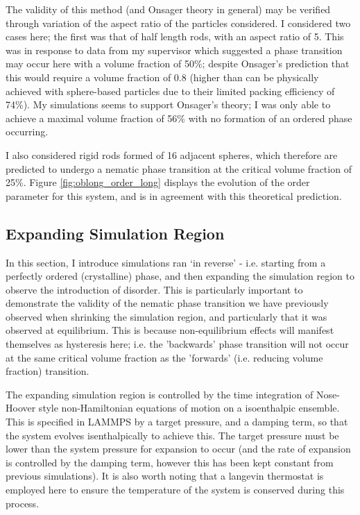 \documentclass[11pt, a4paper]{article} %
\begin{document}
The validity of this method (and Onsager theory in general) may be verified through variation of the aspect ratio of the particles considered. I considered two cases here; the first was that of half length rods, with an aspect ratio of 5. This was in response to data from my supervisor which suggested a phase transition may occur here with a volume fraction of 50\%; despite Onsager's prediction that this would require a volume fraction of 0.8 (higher than can be physically achieved with sphere-based particles due to their limited packing efficiency of 74\%). My simulations seems to support Onsager's theory; I was only able to achieve a maximal volume fraction of 56\% with no formation of an ordered phase occurring. 

I also considered rigid rods formed of 16 adjacent spheres, which therefore are predicted to undergo a nematic phase transition at the critical volume fraction of 25\%. Figure \ref{fig:oblong_order_long} displays the evolution of the order parameter for this system, and is in agreement with this theoretical prediction.\\


\subsection{Expanding Simulation Region}
In this section, I introduce simulations ran `in reverse' - i.e. starting from a perfectly ordered (crystalline) phase, and then expanding the simulation region to observe the introduction of disorder. This is particularly important to demonstrate the validity of the nematic phase transition we have previously observed when shrinking the simulation region, and particularly that it was observed at equilibrium. This is because non-equilibrium effects will manifest themselves as hysteresis here; i.e. the 'backwards' phase transition will not occur at the same critical volume fraction as the 'forwards' (i.e. reducing volume fraction) transition.

The expanding simulation region is controlled by the time integration of Nose-Hoover style non-Hamiltonian equations of motion on a isoenthalpic ensemble. This is specified in LAMMPS by a target pressure, and a damping term, so that the system evolves isenthalpically to achieve this. The target pressure must be lower than the system pressure for expansion to occur (and the rate of expansion is controlled by the damping term, however this has been kept constant from previous simulations). It is also worth noting that a langevin thermostat is employed here to ensure the temperature of the system is conserved during this process.
\end{document}

